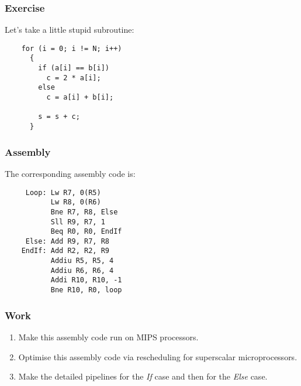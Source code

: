 
\begin{frame}[containsverbatim]
  \frametitle{Exercise}

  Let's take a little stupid subroutine:

  \begin{verbatim}
    for (i = 0; i != N; i++)
      {
        if (a[i] == b[i])
          c = 2 * a[i];
        else
          c = a[i] + b[i];

        s = s + c;
      }
  \end{verbatim}
\end{frame}


\begin{frame}[containsverbatim]
  \frametitle{Assembly}

  The corresponding assembly code is:

  \begin{verbatim}
     Loop: Lw R7, 0(R5)
           Lw R8, 0(R6)
           Bne R7, R8, Else
           Sll R9, R7, 1
           Beq R0, R0, EndIf
     Else: Add R9, R7, R8
    EndIf: Add R2, R2, R9
           Addiu R5, R5, 4
           Addiu R6, R6, 4
           Addi R10, R10, -1
           Bne R10, R0, loop
  \end{verbatim}
\end{frame}


\begin{frame}
  \frametitle{Work}

  \begin{enumerate}
    \item
      Make this assembly code run on MIPS processors.
    \item
      Optimise this assembly code via rescheduling for superscalar
      microprocessors.
    \item
      Make the detailed pipelines for the \textit{If} case and then for
      the \textit{Else} case.
  \end{enumerate}
\end{frame}


